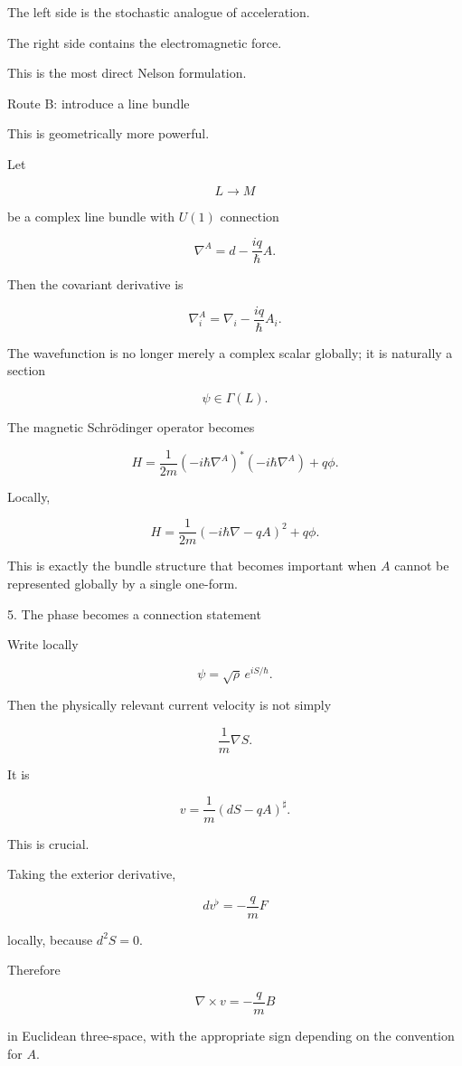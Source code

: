 The left side is the stochastic analogue of acceleration.

The right side contains the electromagnetic force.

This is the most direct Nelson formulation.

Route B: introduce a line bundle

This is geometrically more powerful.

Let

$$ L\rightarrow M $$

be a complex line bundle with \(U(1)\) connection

$$ \nabla^A = d-\frac{iq}{\hbar}A. $$

Then the covariant derivative is

$$ \boxed{ \nabla_i^A = \nabla_i-\frac{iq}{\hbar}A_i. } $$

The wavefunction is no longer merely a complex scalar globally; it is naturally a section

$$ \psi\in\Gamma(L). $$

The magnetic Schrödinger operator becomes

$$ \boxed{ H = \frac{1}{2m} (-i\hbar\nabla^A)^* (-i\hbar\nabla^A) + q\phi. } $$

Locally,

$$ H = \frac{1}{2m} \left(-i\hbar\nabla-qA\right)^2 + q\phi. $$

This is exactly the bundle structure that becomes important when \(A\) cannot be represented globally by a single one-form.

5. The phase becomes a connection statement

Write locally

$$ \psi=\sqrt{\rho}\,e^{iS/\hbar}. $$

Then the physically relevant current velocity is not simply

$$ \frac{1}{m}\nabla S. $$

It is

$$ \boxed{ v = \frac{1}{m} \left( dS-qA \right)^\sharp . } $$

This is crucial.

Taking the exterior derivative,

$$ dv^\flat = -\frac{q}{m}F $$

locally, because \(d^2S=0\).

Therefore

$$ \boxed{ \nabla\times v = -\frac qm B } $$

in Euclidean three-space, with the appropriate sign depending on the convention for \(A\).

